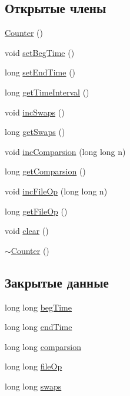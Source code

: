 \subsection*{Открытые члены}
\begin{DoxyCompactItemize}
\item 
\hyperlink{class_counter_a1e05f69b5240fbab3e7ab351672167f0}{Counter} ()
\item 
void \hyperlink{class_counter_a71dea1262b81493aa9734f62a72b2691}{set\+Beg\+Time} ()
\item 
long \hyperlink{class_counter_a338ac4f04d6f5924aa7ace3b14d9ffb9}{set\+End\+Time} ()
\item 
long \hyperlink{class_counter_a25b1a1a6cd43fb23c2d1563d5b05aec6}{get\+Time\+Interval} ()
\item 
void \hyperlink{class_counter_aa0cd30379394257e44aa7afc84ed1fce}{inc\+Swaps} ()
\item 
long \hyperlink{class_counter_af20f10e30e8bd1d078d1d66c518a814c}{get\+Swaps} ()
\item 
void \hyperlink{class_counter_a224d93150c0fe2982d3efd7aa99668e6}{inc\+Comparsion} (long long n)
\item 
long \hyperlink{class_counter_a273aaa4592ef5fae6b7a90544d0ff6e0}{get\+Comparsion} ()
\item 
void \hyperlink{class_counter_a63310182709c321ad8fe8e78b81d12aa}{inc\+File\+Op} (long long n)
\item 
long \hyperlink{class_counter_ac0a53b0296d0eacca2a2391a12ae39c5}{get\+File\+Op} ()
\item 
void \hyperlink{class_counter_af66c74ac2bc69fa4f30c34377f869596}{clear} ()
\item 
\hyperlink{class_counter_a97f4728470ae8eff37d50ef1d6bb0135}{$\sim$\+Counter} ()
\end{DoxyCompactItemize}
\subsection*{Закрытые данные}
\begin{DoxyCompactItemize}
\item 
long long \hyperlink{class_counter_ae2f8fa6947d7daa4b977d4aae2ee3c43}{beg\+Time}
\item 
long long \hyperlink{class_counter_a961ca391c9a8e3ac0efb8d6d61d734d4}{end\+Time}
\item 
long long \hyperlink{class_counter_a20f5a772c02412c338457dcc85c4a543}{comparsion}
\item 
long long \hyperlink{class_counter_abc197117fc99ab93bebc483059ae0fbc}{file\+Op}
\item 
long long \hyperlink{class_counter_a2a5ee961a25c6eb87d1ad02bcef4ade1}{swaps}
\end{DoxyCompactItemize}


